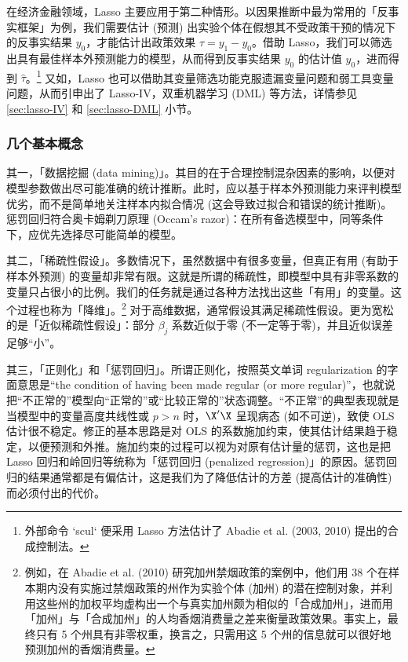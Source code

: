 在经济金融领域，Lasso 主要应用于第二种情形。以因果推断中最为常用的「反事实框架」为例，我们需要估计 (预测) 出实验个体在假想其不受政策干预的情况下的反事实结果 $y_0$，才能估计出政策效果 $\tau = y_1 - y_0$。借助 Lasso，我们可以筛选出具有最佳样本外预测能力的模型，从而得到反事实结果 $y_0$ 的估计值 $\widehat{y}_0$，进而得到 $\widehat{\tau}$。\footnote{%
      外部命令 `scul` 便采用 Lasso 方法估计了 Abadie et al. (2003, 2010) 提出的合成控制法。}
又如，Lasso 也可以借助其变量筛选功能克服遗漏变量问题和弱工具变量问题，从而引申出了 Lasso-IV，双重机器学习 (DML) 等方法，详情参见 \ref{sec:lasso-IV} 和 \ref{sec:lasso-DML} 小节。 

\subsubsection{几个基本概念}

其一，「数据挖掘 (data mining)」。其目的在于合理控制混杂因素的影响，以便对模型参数做出尽可能准确的统计推断。此时，应以基于样本外预测能力来评判模型优劣，而不是简单地关注样本内拟合情况 (这会导致过拟合和错误的统计推断)。惩罚回归符合奥卡姆剃刀原理 (Occam's razor)：在所有备选模型中，同等条件下，应优先选择尽可能简单的模型。

其二，「稀疏性假设」。多数情况下，虽然数据中有很多变量，但真正有用 (有助于样本外预测) 的变量却非常有限。这就是所谓的稀疏性，即模型中具有非零系数的变量只占很小的比例。我们的任务就是通过各种方法找出这些「有用」的变量。这个过程也称为「降维」。\footnote{%
      例如，在 Abadie et al. (2010) 研究加州禁烟政策的案例中，他们用 38 个在样本期内没有实施过禁烟政策的州作为实验个体 (加州) 的潜在控制对象，并利用这些州的加权平均虚构出一个与真实加州颇为相似的「合成加州」，进而用「加州」与「合成加州」的人均香烟消费量之差来衡量政策效果。事实上，最终只有 5 个州具有非零权重，换言之，只需用这 5 个州的信息就可以很好地预测加州的香烟消费量。}
对于高维数据，通常假设其满足稀疏性假设。更为宽松的是「近似稀疏性假设\label{page:稀疏性假设}」：部分 $\beta_{j}$ 系数近似于零 (不一定等于零)，并且近似误差足够“小”。



其三，「正则化」和「惩罚回归」。所谓正则化，按照英文单词 regularization 的字面意思是“the condition of having been made regular (or more regular)”，也就说把“不正常的”模型向“正常的”或“比较正常的”状态调整。“不正常”的典型表现就是当模型中的变量高度共线性或 $p>n$ 时，$\X'\X$ 呈现病态 (如不可逆)，致使 OLS 估计很不稳定。修正的基本思路是对 OLS 的系数施加约束，使其估计结果趋于稳定，以便预测和外推。施加约束的过程可以视为对原有估计量的惩罚，这也是把 Lasso 回归和岭回归等统称为「惩罚回归 (penalized regression)」的原因。惩罚回归的结果通常都是有偏估计，这是我们为了降低估计的方差 (提高估计的准确性) 而必须付出的代价。  

